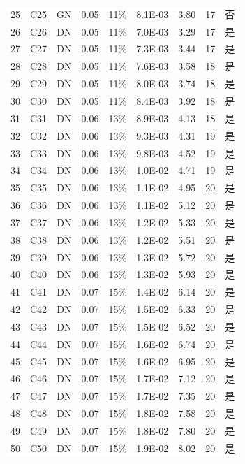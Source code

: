 {\begin{longtable}{ccccccccc}
25&C25&GN&0.05&11\%&8.1E-03&3.80&17&否\\
26&C26&DN&0.05&11\%&7.0E-03&3.29&17&是\\
27&C27&DN&0.05&11\%&7.3E-03&3.44&17&是\\
28&C28&DN&0.05&11\%&7.6E-03&3.58&18&是\\
29&C29&DN&0.05&11\%&8.0E-03&3.74&18&是\\
30&C30&DN&0.05&11\%&8.4E-03&3.92&18&是\\
31&C31&DN&0.06&13\%&8.9E-03&4.13&18&是\\
32&C32&DN&0.06&13\%&9.3E-03&4.31&19&是\\
33&C33&DN&0.06&13\%&9.8E-03&4.52&19&是\\
34&C34&DN&0.06&13\%&1.0E-02&4.71&19&是\\
35&C35&DN&0.06&13\%&1.1E-02&4.95&20&是\\
36&C36&DN&0.06&13\%&1.1E-02&5.12&20&是\\
37&C37&DN&0.06&13\%&1.2E-02&5.33&20&是\\
38&C38&DN&0.06&13\%&1.2E-02&5.51&20&是\\
39&C39&DN&0.06&13\%&1.3E-02&5.72&20&是\\
40&C40&DN&0.06&13\%&1.3E-02&5.93&20&是\\
41&C41&DN&0.07&15\%&1.4E-02&6.14&20&是\\
42&C42&DN&0.07&15\%&1.5E-02&6.33&20&是\\
43&C43&DN&0.07&15\%&1.5E-02&6.52&20&是\\
44&C44&DN&0.07&15\%&1.6E-02&6.74&20&是\\
45&C45&DN&0.07&15\%&1.6E-02&6.95&20&是\\
46&C46&DN&0.07&15\%&1.7E-02&7.12&20&是\\
47&C47&DN&0.07&15\%&1.7E-02&7.35&20&是\\
48&C48&DN&0.07&15\%&1.8E-02&7.58&20&是\\
49&C49&DN&0.07&15\%&1.8E-02&7.80&20&是\\
50&C50&DN&0.07&15\%&1.9E-02&8.02&20&是\\
\end{longtable}
}
